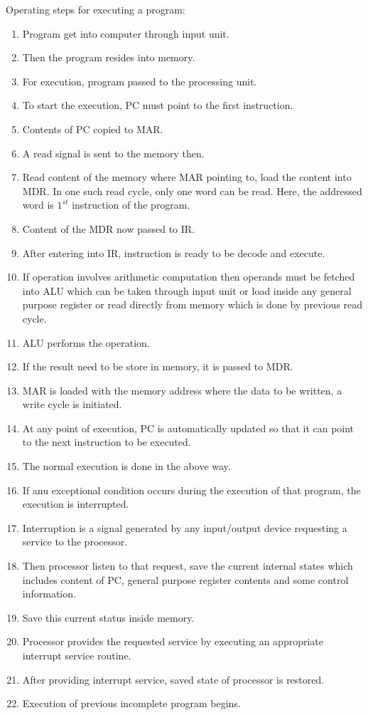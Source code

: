 \documentclass[12 pt, letterpaper]{extarticle}
\begin{document}
Operating steps for executing a program:
\begin{enumerate}
	\item Program get into computer through input unit.
	\item Then the program resides into memory.
	\item For execution, program passed to the processing unit.
	\item To start the execution, PC must point to the first instruction.
	\item Contents of PC copied to MAR.
	\item A read signal is sent to the memory then.
	\item Read content of the memory where MAR pointing to, load the content into MDR. In one such read cycle, only one word can be read. Here, the addressed word is $1^{st}$ instruction of the program.
	\item Content of the MDR now passed to IR.
	\item After entering into IR, instruction is ready to be decode and execute.
	\item If operation involves arithmetic computation then operands must be fetched into ALU which can be taken through input unit or load inside any general purpose register or read directly from memory which is done by previous read cycle.
	\item ALU performs the operation.
	\item If the result need to be store in memory, it is passed to MDR.
	\item MAR is loaded with the memory address where the data to be written, a write cycle is initiated.
	\item At any point of execution, PC is automatically updated so that it can point to the next instruction to be executed.
	\item The normal execution is done in the above way.
	\item If anu exceptional condition occurs during the execution of that program, the execution is interrupted.
	\item Interruption is a signal generated by any input/output device requesting a service to the processor.
	\item Then processor listen to that request, save the current internal states which includes content of PC, general purpose register contents and some control information.
	\item Save this current status inside memory.
	\item Processor provides the requested service by executing an appropriate interrupt service routine.
	\item After providing interrupt service, saved state of processor is restored.
	\item Execution of previous incomplete program begins.
\end{enumerate}
\end{document}

